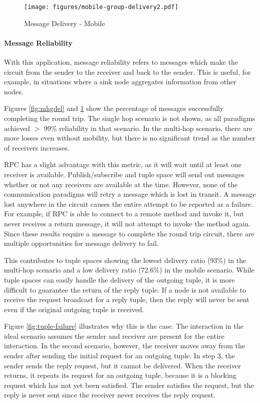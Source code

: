 \begin{figure}
\centering
\texttt{[image: figures/mobile-group-delivery2.pdf]}
\caption{Message Delivery - Mobile}
\label{fig:mgdel}
\end{figure}


\paragraph{Message Reliability}\label{sec:group_reliability}

With this application, message reliability refers to messages which make the circuit from the sender to the receiver and back to the sender. This is useful, for example, in situations where a sink node aggregates information from other nodes.

Figures \ref{fig:mhgdel} and \ref{fig:mgdel} show the percentage of messages successfully completing the round trip. The single hop scenario is not shown, as all paradigms achieved $>$ 99\% reliability in that scenario. In the multi-hop scenario, there are more losses even without mobility, but there is no significant trend as the number of receivers increases.

RPC has a slight advantage with this metric, as it will wait until at least one receiver is available. Publish/subscribe and tuple space will send out messages whether or not any receivers are available at the time. However, none of the communication paradigms will retry a message which is lost in transit. A message lost anywhere in the circuit causes the entire attempt to be reported as a failure. For example, if RPC is able to connect to a remote method and invoke it, but never receives a return message, it will not attempt to invoke the method again. Since these results require a message to complete the round trip circuit, there are multiple opportunities for message delivery to fail. 

This contributes to tuple spaces showing the lowest delivery ratio (93\%) in the multi-hop scenario and a low delivery ratio (72.6\%) in the mobile scenario. While tuple spaces can easily handle the delivery of the outgoing tuple, it is more difficult to guarantee the return of the reply tuple. If a node is not available to receive the request broadcast for a reply tuple, then the reply will never be sent even if the original outgoing tuple is received.

Figure \ref{fig:tuple-failure} illustrates why this is the case. The interaction in the ideal scenario assumes the sender and receiver are present for the entire interaction. In the second scenario, however, the receiver moves away from the sender after sending the initial request for an outgoing tuple. In step 3, the sender sends the reply request, but it cannot be delivered. When the receiver returns, it repeats its request for an outgoing tuple, because it is a blocking request which has not yet been satisfied. The sender satisfies the request, but the reply is never sent since the receiver never receives the reply request.

